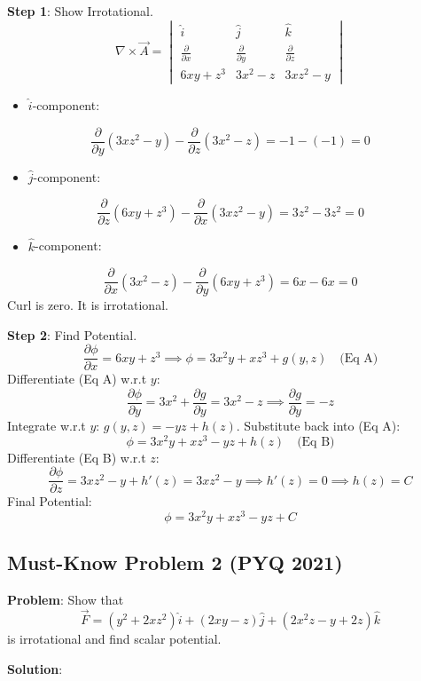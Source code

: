 \documentclass[
]{article}
\providecommand{\tightlist}{%
  \setlength{\itemsep}{0pt}\setlength{\parskip}{0pt}}
\begin{document}
\textbf{Step 1}: Show Irrotational.
\[
\nabla \times \vec{A} =
\begin{vmatrix}
\hat{i} & \hat{j} & \hat{k} \\
\frac{\partial}{\partial x} & \frac{\partial}{\partial y} & \frac{\partial}{\partial z} \\
6xy + z^3 & 3x^2 - z & 3xz^2 - y
\end{vmatrix}
\]
\begin{itemize}
\tightlist
\item
  \(\hat{i}\)-component:
\end{itemize}
\[
\frac{\partial}{\partial y}(3xz^2 - y) - \frac{\partial}{\partial z}(3x^2 - z) = -1 - (-1) = 0
\]
\begin{itemize}
\tightlist
\item
  \(\hat{j}\)-component:
\end{itemize}
\[
\frac{\partial}{\partial z}(6xy + z^3) - \frac{\partial}{\partial x}(3xz^2 - y) = 3z^2 - 3z^2 = 0
\]
\begin{itemize}
\tightlist
\item
  \(\hat{k}\)-component:
\end{itemize}
\[
\frac{\partial}{\partial x}(3x^2 - z) - \frac{\partial}{\partial y}(6xy + z^3) = 6x - 6x = 0
\]
Curl is zero. It is irrotational.

\textbf{Step 2}: Find Potential.
\[
\frac{\partial\phi}{\partial x} = 6xy + z^3 \implies \phi = 3x^2y + xz^3 + g(y, z) \quad \text{(Eq A)}
\]
Differentiate (Eq A) w.r.t \(y\):
\[
\frac{\partial\phi}{\partial y} = 3x^2 + \frac{\partial g}{\partial y} = 3x^2 - z \implies \frac{\partial g}{\partial y} = -z
\]
Integrate w.r.t \(y\): \(g(y, z) = -yz + h(z)\). Substitute back into
(Eq A):
\[
\phi = 3x^2y + xz^3 - yz + h(z) \quad \text{(Eq B)}
\]
Differentiate (Eq B) w.r.t \(z\):
\[
\frac{\partial\phi}{\partial z} = 3xz^2 - y + h'(z) = 3xz^2 - y \implies h'(z) = 0 \implies h(z) = C
\]
Final Potential:
\[
\phi = 3x^2y + xz^3 - yz + C
\]

\subsection{Must-Know Problem 2 (PYQ
2021)}\label{must-know-problem-2-pyq-2021}

\textbf{Problem}: Show that
\[
\vec{F} = (y^2 + 2xz^2)\hat{i} + (2xy - z)\hat{j} + (2x^2z - y + 2z)\hat{k}
\]
is irrotational and find scalar potential.

\textbf{Solution}:
\end{document}

